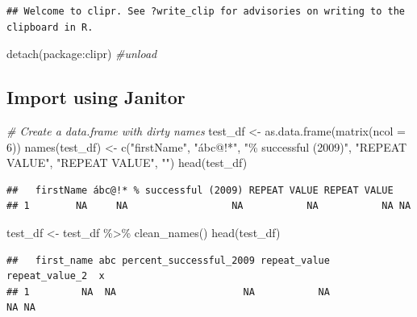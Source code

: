 \documentclass[
]{article}
\newenvironment{Shaded}{\begin{snugshade}}{\end{snugshade}}
\newcommand{\AttributeTok}[1]{\textcolor[rgb]{0.77,0.63,0.00}{#1}}
\newcommand{\CommentTok}[1]{\textcolor[rgb]{0.56,0.35,0.01}{\textit{#1}}}
\newcommand{\DecValTok}[1]{\textcolor[rgb]{0.00,0.00,0.81}{#1}}
\newcommand{\FunctionTok}[1]{\textcolor[rgb]{0.00,0.00,0.00}{#1}}
\newcommand{\NormalTok}[1]{#1}
\newcommand{\OtherTok}[1]{\textcolor[rgb]{0.56,0.35,0.01}{#1}}
\newcommand{\SpecialCharTok}[1]{\textcolor[rgb]{0.00,0.00,0.00}{#1}}
\newcommand{\StringTok}[1]{\textcolor[rgb]{0.31,0.60,0.02}{#1}}
\begin{document}
\begin{verbatim}
## Welcome to clipr. See ?write_clip for advisories on writing to the clipboard in R.
\end{verbatim}

\begin{Shaded}
\begin{Highlighting}[]
\FunctionTok{detach}\NormalTok{(package}\SpecialCharTok{:}\NormalTok{clipr) }\CommentTok{\#unload}
\end{Highlighting}
\end{Shaded}

\hypertarget{import-using-janitor}{%
\subsection{Import using Janitor}\label{import-using-janitor}}

\begin{Shaded}
\begin{Highlighting}[]
\CommentTok{\# Create a data.frame with dirty names}
\NormalTok{test\_df }\OtherTok{\textless{}{-}} \FunctionTok{as.data.frame}\NormalTok{(}\FunctionTok{matrix}\NormalTok{(}\AttributeTok{ncol =} \DecValTok{6}\NormalTok{))}
\FunctionTok{names}\NormalTok{(test\_df) }\OtherTok{\textless{}{-}} \FunctionTok{c}\NormalTok{(}\StringTok{"firstName"}\NormalTok{, }\StringTok{"ábc@!*"}\NormalTok{, }\StringTok{"\% successful (2009)"}\NormalTok{,}
                    \StringTok{"REPEAT VALUE"}\NormalTok{, }\StringTok{"REPEAT VALUE"}\NormalTok{, }\StringTok{""}\NormalTok{)}
\FunctionTok{head}\NormalTok{(test\_df)}
\end{Highlighting}
\end{Shaded}

\begin{verbatim}
##   firstName ábc@!* % successful (2009) REPEAT VALUE REPEAT VALUE   
## 1        NA     NA                  NA           NA           NA NA
\end{verbatim}

\begin{Shaded}
\begin{Highlighting}[]
\NormalTok{test\_df }\OtherTok{\textless{}{-}}\NormalTok{ test\_df }\SpecialCharTok{\%\textgreater{}\%}
  \FunctionTok{clean\_names}\NormalTok{()}
\FunctionTok{head}\NormalTok{(test\_df)}
\end{Highlighting}
\end{Shaded}

\begin{verbatim}
##   first_name abc percent_successful_2009 repeat_value repeat_value_2  x
## 1         NA  NA                      NA           NA             NA NA
\end{verbatim}
\end{document}
